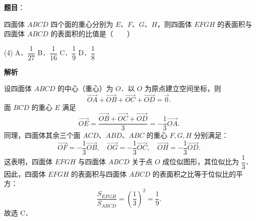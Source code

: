 \begin{answer}

\textbf{题目}：

四面体 $ABCD$ 四个面的重心分别为 $E$、$F$、$G$、$H$，则四面体 $EFGH$ 的表面积与四面体 $ABCD$ 的表面积的比值是\mbox{（　　）}

\begin{gkopts}(4)
\task A．$\dfrac{1}{27}$
\task B．$\dfrac{1}{16}$
\task C．$\dfrac{1}{9}$
\task D．$\dfrac{1}{8}$
\end{gkopts}

\textbf{解析}

设四面体 $ABCD$ 的中心（重心）为 $O$．以 $O$ 为原点建立空间坐标，则
\nopagebreak[4]
\[
\overrightarrow{OA} + \overrightarrow{OB} + \overrightarrow{OC} + \overrightarrow{OD} = \vec{0}.
\]
面 $BCD$ 的重心 $E$ 满足
\nopagebreak[4]
\[
\overrightarrow{OE} = \frac{\overrightarrow{OB} + \overrightarrow{OC} + \overrightarrow{OD}}{3} = -\frac{1}{3}\overrightarrow{OA}.
\]
同理，四面体其余三个面 $ACD$、$ABD$、$ABC$ 的重心 $F, G, H$ 分别满足：
\nopagebreak[4]
\[
\overrightarrow{OF} = -\frac{1}{3}\overrightarrow{OB}, \quad \overrightarrow{OG} = -\frac{1}{3}\overrightarrow{OC}, \quad \overrightarrow{OH} = -\frac{1}{3}\overrightarrow{OD}.
\]
这表明，四面体 $EFGH$ 与四面体 $ABCD$ 关于点 $O$ 成位似图形，其位似比为 $\dfrac{1}{3}$．
因此，四面体 $EFGH$ 的表面积与四面体 $ABCD$ 的表面积之比等于位似比的平方：
\nopagebreak[4]
\[
\frac{S_{EFGH}}{S_{ABCD}} = \left(\frac{1}{3}\right)^2 = \frac{1}{9}.
\]
故选 C．


\end{answer}
